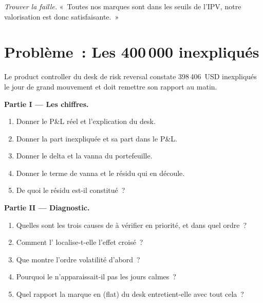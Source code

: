 \begin{exercise}[$\star\star\star$]\label{exo:rc:pnl-explain-and-independent-price-verification:8}
\emph{Trouver la faille.} «~Toutes nos marques sont dans les seuils de l'IPV, notre valorisation est donc satisfaisante.~»
\end{exercise}

\section{Problème~: Les 400\,000 inexpliqués}

\begin{problem}\label{pb:rc:pnl-explain-and-independent-price-verification:1}
Le product controller du desk de risk reversal constate 398\,406~USD inexpliqués le jour de grand mouvement et doit
remettre son rapport au matin.

\medskip\noindent\textbf{Partie I --- Les chiffres.}
\begin{enumerate}
\item Donner le P\&L réel et l'explication du desk.
\item Donner la part inexpliquée et sa part dans le P\&L.
\item Donner le delta et la vanna du portefeuille.
\item Donner le terme de vanna et le résidu qui en découle.
\item De quoi le résidu est-il constitué~?
\end{enumerate}

\medskip\noindent\textbf{Partie II --- Diagnostic.}
\begin{enumerate}[resume]
\item Quelles sont les trois causes de  à vérifier en priorité, et dans quel ordre~?
\item Comment l' localise-t-elle l'effet croisé~?
\item Que montre l'ordre volatilité d'abord~?
\item Pourquoi le  n'apparaissait-il pas les jours calmes~?
\item Quel rapport la marque en  (flat) du desk entretient-elle avec tout cela~?
\end{enumerate}


\end{problem}

